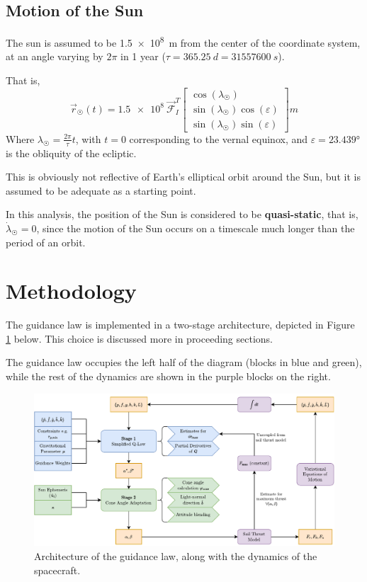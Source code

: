 \subsection{Motion of the Sun}
The sun is assumed to be \qty{1.5e8}{m} from the center of the coordinate system, at an angle varying by \(2\pi\) in 1 year (\(\tau = \qty{365.25}{d} = \qty{31557600}{s}\)).

That is,
\begin{equation}
  \vec{r}_{\astrosun}(t) =
  \num{1.5e8}
  \
  \mathcal{\vec{F}}_I^T
  \begin{bmatrix}
    \cos(\lambda_{\astrosun})                   \\
    \sin(\lambda_{\astrosun}) \cos(\varepsilon) \\
    \sin(\lambda_{\astrosun}) \sin(\varepsilon)
  \end{bmatrix}
  \unit{m}
  \label{eq:sun_position_3d}
\end{equation}
Where \(\lambda_{\astrosun} = \frac{2 \pi}{\tau} t\), with \(t=0\) corresponding to the vernal equinox, and \(\varepsilon = \ang{23.439}\) is the obliquity of the ecliptic.

This is obviously not reflective of Earth's elliptical orbit around the Sun, but it is assumed to be adequate as a starting point.

In this analysis, the position of the Sun is considered to be \textbf{quasi-static}, that is, \(\dot{\lambda}_{\astrosun} = 0\), since the motion of the Sun occurs on a timescale much longer than the period of an orbit.

\section{Methodology}
The guidance law is implemented in a two-stage architecture, depicted in Figure \ref{fig:algorithm_diagram} below. This choice is discussed more in proceeding sections.

The guidance law occupies the left half of the diagram (blocks in blue and green), while the rest of the dynamics are shown in the purple blocks on the right.

\begin{figure}[H]
  \centering
  \includegraphics[width=\textwidth]{figures/compute_topology.drawio.pdf}
  \caption{Architecture of the guidance law, along with the dynamics of the spacecraft.}
  \label{fig:algorithm_diagram}
\end{figure}

